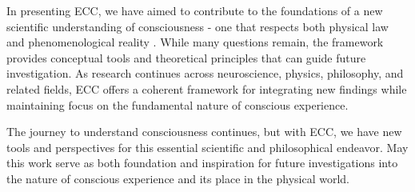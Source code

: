 In presenting ECC, we have aimed to contribute to the foundations of a new scientific understanding of consciousness - one that respects both physical law and phenomenological reality \cite{dennett2017bacteria}. While many questions remain, the framework provides conceptual tools and theoretical principles that can guide future investigation. As research continues across neuroscience, physics, philosophy, and related fields, ECC offers a coherent framework for integrating new findings while maintaining focus on the fundamental nature of conscious experience.

The journey to understand consciousness continues, but with ECC, we have new tools and perspectives for this essential scientific and philosophical endeavor. May this work serve as both foundation and inspiration for future investigations into the nature of conscious experience and its place in the physical world.
